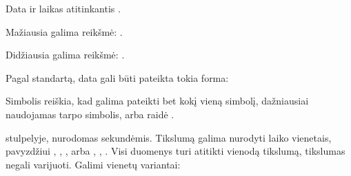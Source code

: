 \documentclass[letterpaper,10pt,lithuanian]{sphinxmanual}
\begin{document}
\begin{fulllineitems}
\label{\detokenize{tipai:type.datetime}}
\pysigstartsignatures
\pysigline
{}
\pysigstopsignatures
\sphinxAtStartPar
Data ir laikas atitinkantis .

\sphinxAtStartPar
Mažiausia galima reikšmė: .

\sphinxAtStartPar
Didžiausia galima reikšmė: .

\sphinxAtStartPar
Pagal  standartą, data gali būti pateikta tokia forma:

\begin{sphinxVerbatim}[commandchars=\\\{\}]
\PYG{p}{[}\PYG{p}{[}\PYG{p}{[}\PYG{p}{[}\PYG{p}{[}\PYG{p}{]}\PYG{p}{]}\PYG{p}{]}\PYG{p}{]}\PYG{p}{[}\PYG{p}{[}\PYG{p}{[}\PYG{p}{]}\PYG{p}{]}\PYG{p}{]}\PYG{p}{]}
\end{sphinxVerbatim}

\sphinxAtStartPar
Simbolis \sphinxcode{\sphinxupquote{*}} reiškia, kad galima pateikti bet kokį vieną simbolį,
dažniausiai naudojamas tarpo simbolis, arba raidė .

\sphinxAtStartPar
{\hyperref[\detokenize{dimensijos:property.ref}]{}} stulpelyje, nurodomas 
sekundėmis. Tikslumą galima nurodyti laiko vienetais, pavyzdžiui ,
, , arba , , . Visi duomenys turi atitikti vienodą
tikslumą, tikslumas negali varijuoti. Galimi vienetų variantai:



\end{fulllineitems}
\end{document}
